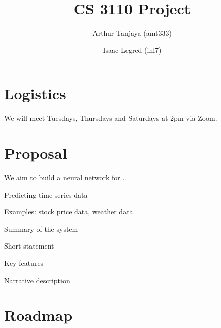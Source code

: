 \documentclass{article}
\author{Arthur Tanjaya (amt333) \and Isaac Legred (inl7)}
\title{CS 3110 Project}
\begin{document}
\maketitle

\section{Logistics}

We will meet Tuesdays, Thursdays and Saturdays at 2pm via Zoom.

\section{Proposal}

We aim to build a neural network for .

Predicting time series data

Examples: stock price data, weather data

Summary of the system

Short statement

Key features

Narrative description

\section{Roadmap}
\end{document}
